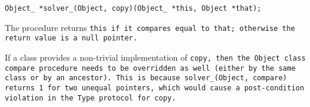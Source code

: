 
\tt{Object_ *solver_(Object, copy)(Object_ *this, Object *that);}


The procedure returns \tt{this} if it compares equal to \tt{that};
otherwise the return value is a null pointer.

\note If a class provides a non-trivial implementation of \tt{copy},
then the \tt{Object} class \tt{compare} procedure needs to be
overridden as well (either by the same class or by an ancestor).
This is because \tt{solver_(Object, compare)} returns 1 for
two unequal pointers, which would cause a post-condition
violation in the \tt{Type} protocol for \tt{copy}.
